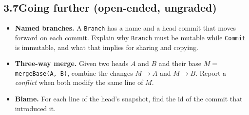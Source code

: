 \documentclass[11pt,a4paper]{article}
\newcommand{\code}[1]{\lstinline[basicstyle=\ttfamily\normalsize,basewidth=0.5em]{#1}}
\begin{document}
\subsection*{3.7\quad Going further (open-ended, ungraded)}
\begin{itemize}[itemsep=2pt]
  \item \textbf{Named branches.} A \code{Branch} has a name and a head commit
        that moves forward on each commit. Explain why \code{Branch} must be
        mutable while \code{Commit} is immutable, and what that implies for
        sharing and copying.
  \item \textbf{Three-way merge.} Given two heads $A$ and $B$ and their base
        $M = $ \code{mergeBase(A, B)}, combine the changes $M \to A$ and $M \to B$.
        Report a \emph{conflict} when both modify the same line of $M$.
  \item \textbf{Blame.} For each line of the head's snapshot, find the id of the
        commit that introduced it.
\end{itemize}
\end{document}
